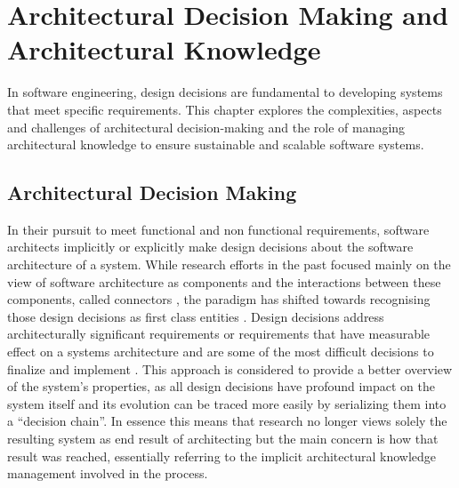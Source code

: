 \chapter{Architectural Decision Making and Architectural Knowledge}
    In software engineering, design decisions are fundamental to developing systems that meet specific requirements. This chapter explores the complexities, aspects and challenges of architectural decision-making and the role of managing architectural knowledge to ensure sustainable and scalable software systems.

    \section{Architectural Decision Making}
        In their pursuit to meet functional and non functional requirements, software architects implicitly or explicitly make design decisions about the software architecture of a system. While research efforts in the past focused mainly on the view of software architecture as components and the interactions between these components, called connectors \cite{software_arch_in_practice_book, intro_to_software_arch_TOPICS}, the paradigm has shifted towards recognising those design decisions as first class entities \cite{first-class-Arch-decisions}. Design decisions address architecturally significant requirements or requirements that have measurable effect on a systems architecture and are some of the most difficult decisions to finalize and implement \cite{software_arch_in_practice_book}. This approach is considered to provide a better overview of the system's properties, as all design decisions have profound impact on the system itself and its evolution can be traced more easily by serializing them into a ``decision chain''. In essence this means that research no longer views solely the resulting system as end result of architecting but the main concern is how that result was reached, essentially referring to the implicit architectural knowledge management involved in the process.

